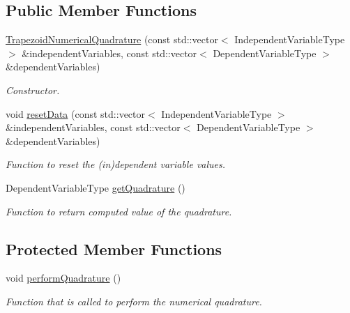 \subsection*{Public Member Functions}
\begin{DoxyCompactItemize}
\item 
\hyperlink{classtudat_1_1numerical__quadrature_1_1TrapezoidNumericalQuadrature_a9f6d286ea475f0fcbea651652753befa}{Trapezoid\+Numerical\+Quadrature} (const std\+::vector$<$ Independent\+Variable\+Type $>$ \&independent\+Variables, const std\+::vector$<$ Dependent\+Variable\+Type $>$ \&dependent\+Variables)
\begin{DoxyCompactList}\small\item\em Constructor. \end{DoxyCompactList}\item 
void \hyperlink{classtudat_1_1numerical__quadrature_1_1TrapezoidNumericalQuadrature_af18d8bced503240cfd92315fc7f1b531}{reset\+Data} (const std\+::vector$<$ Independent\+Variable\+Type $>$ \&independent\+Variables, const std\+::vector$<$ Dependent\+Variable\+Type $>$ \&dependent\+Variables)
\begin{DoxyCompactList}\small\item\em Function to reset the (in)dependent variable values. \end{DoxyCompactList}\item 
Dependent\+Variable\+Type \hyperlink{classtudat_1_1numerical__quadrature_1_1TrapezoidNumericalQuadrature_a07f87eae9444f7bbafb53fb83318d356}{get\+Quadrature} ()
\begin{DoxyCompactList}\small\item\em Function to return computed value of the quadrature. \end{DoxyCompactList}\end{DoxyCompactItemize}
\subsection*{Protected Member Functions}
\begin{DoxyCompactItemize}
\item 
void \hyperlink{classtudat_1_1numerical__quadrature_1_1TrapezoidNumericalQuadrature_a2f675b21a3a8176da38893bd7632c702}{perform\+Quadrature} ()
\begin{DoxyCompactList}\small\item\em Function that is called to perform the numerical quadrature. \end{DoxyCompactList}\end{DoxyCompactItemize}


